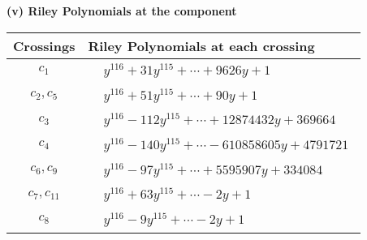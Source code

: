 \documentclass[1p]{elsarticle_modified}
\theoremstyle{definition}
\begin{document}
\newpage\renewcommand{\arraystretch}{1}
\flushleft \textbf{(v) Riley Polynomials at the component}\newline \\
\begin{tabular}{m{50pt}|m{274pt}}
Crossings & \hspace{64pt}Riley Polynomials at each crossing \\
\hline $$\begin{aligned}c_{1}\end{aligned}$$&$\begin{aligned}
&y^{116}+31 y^{115}+\cdots+9626 y+1
\end{aligned}$\\
\hline $$\begin{aligned}c_{2},c_{5}\end{aligned}$$&$\begin{aligned}
&y^{116}+51 y^{115}+\cdots+90 y+1
\end{aligned}$\\
\hline $$\begin{aligned}c_{3}\end{aligned}$$&$\begin{aligned}
&y^{116}-112 y^{115}+\cdots+12874432 y+369664
\end{aligned}$\\
\hline $$\begin{aligned}c_{4}\end{aligned}$$&$\begin{aligned}
&y^{116}-140 y^{115}+\cdots-610858605 y+4791721
\end{aligned}$\\
\hline $$\begin{aligned}c_{6},c_{9}\end{aligned}$$&$\begin{aligned}
&y^{116}-97 y^{115}+\cdots+5595907 y+334084
\end{aligned}$\\
\hline $$\begin{aligned}c_{7},c_{11}\end{aligned}$$&$\begin{aligned}
&y^{116}+63 y^{115}+\cdots-2 y+1
\end{aligned}$\\
\hline $$\begin{aligned}c_{8}\end{aligned}$$&$\begin{aligned}
&y^{116}-9 y^{115}+\cdots-2 y+1
\end{aligned}$\\

\end{tabular}
\end{document}
